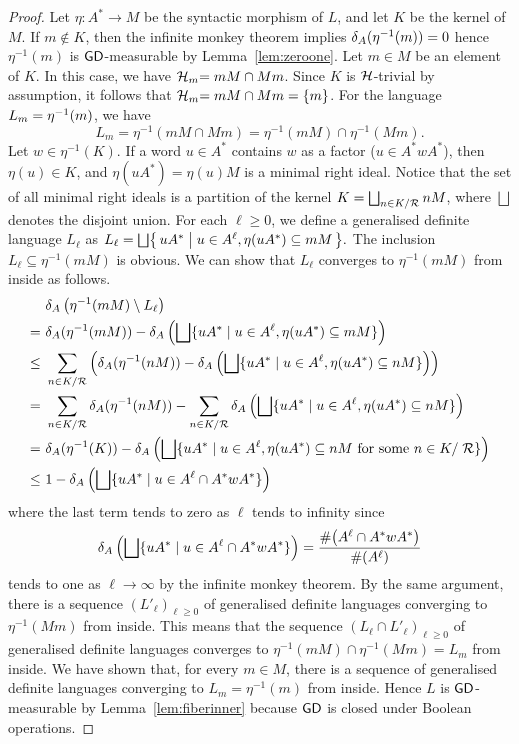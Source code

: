\begin{proof}
Let \(\eta\colon A^* \rightarrow M\) be the syntactic morphism of \(L\), and
let \(K\) be the kernel of \(M\).
If \(m \not\in K\), then the infinite monkey theorem implies 
\(\delta_{A}(\eta^{-1}(m)) = 0\) hence \(\eta^{-1}(m)\) is \(\mathsf{GD}\)-measurable by Lemma~\ref{lem:zeroone}.
Let \(m \in M\) be an element of \(K\).
In this case, we have \(\mathrel{\cal H}_m = mM \cap Mm\).
Since \(K\) is \(\mathrel{\cal H}\)-trivial by assumption, it follows that
\(\mathrel{\cal H}_m = mM \cap Mm = \{m\}\).
For the language \(L_m = \eta^{-1}(m)\), we have
\[
 L_m = \eta^{-1}(mM \cap Mm)
 = \eta^{-1}(mM) \cap \eta^{-1}(Mm).
\]
Let \(w \in \eta^{-1}(K)\).
If a word \(u \in A^*\) contains \(w\) as a factor (\ie \(u \in A^* w A^*\)), then \(\eta(u) \in K\), and \(\eta(uA^*) = \eta(u) M\) is a minimal right ideal. 
Notice that the set of all minimal right ideals is a partition of the kernel 
\(
 K = \bigsqcup_{n \in K / \mathrel{\cal R}} nM
\), where \(\bigsqcup\) denotes the disjoint union.
For each \(\ell \geq 0\), we define a generalised definite language \(L_\ell\) as
\(
 L_\ell = \bigsqcup\set{uA^*}{u \in A^\ell, \eta(uA^*) \subseteq mM}.
\)
The inclusion \(L_\ell \subseteq \eta^{-1}(mM)\) is obvious.
We can show that \(L_\ell\) converges to \(\eta^{-1}(mM)\) from inside as follows.
\begin{align*}
& \,\, \delta_{A}\left(\eta^{-1}(mM) \setminus L_\ell\right)\\
= & \,\,
\delta_{A}(\eta^{-1}(mM)) - \delta_{A}\left(\bigsqcup\{ uA^* \mid u \in A^\ell, \eta(uA^*) \subseteq mM\}\right)\\
\leq & \,\,
\sum_{n \in K / \mathrel{\cal R}} \left( \delta_{A}(\eta^{-1}(nM)) - \delta_{A}\left(\bigsqcup\{ uA^* \mid u \in A^\ell, \eta(uA^*) \subseteq nM\}\right) \right)\\
= & \,\,
\sum_{n \in K / \mathrel{\cal R}} \delta_{A}(\eta^{-1}(nM))
 - \sum_{n \in K / \mathrel{\cal R}} \delta_{A}\left(\bigsqcup\{ uA^* \mid u \in A^\ell, \eta(uA^*) \subseteq nM\}\right)\\
= & \,\,
\delta_{A}(\eta^{-1}(K))
 - \delta_{A}\left(\bigsqcup\{ uA^* \mid u \in A^\ell, \eta(uA^*) \subseteq nM \text{ for some } n \in K/\mathrel{\cal R}\}\right)\\
\leq & \,\,
1 - \delta_{A}\left(\bigsqcup\{ uA^* \mid u \in A^\ell \cap A^* w A^*\}\right)
\end{align*}
where the last term tends to zero as \(\ell\) tends to infinity since 
\[
\delta_{A}\left(\bigsqcup\{ uA^* \mid u \in A^\ell \cap A^* w A^*\}\right)
= \frac{\#\!\left(A^\ell \cap A^* w A^*\right)}{\#\!\left(A^\ell\right)}
\]
tends to one as \(\ell \to \infty\) by the infinite monkey theorem.
By the same argument, there is a sequence \((L'_\ell)_{\ell \geq 0}\) of generalised definite languages converging to \(\eta^{-1}(Mm)\) from inside.
This means that the sequence \((L_\ell \cap L'_\ell)_{\ell \geq 0}\)
of generalised definite languages converges to \(\eta^{-1}(mM) \cap \eta^{-1}(Mm) = L_m\) from inside.
We have shown that, for every \(m \in M\),
there is a sequence of generalised definite languages converging to \(L_m = \eta^{-1}(m)\) from inside.
Hence \(L\) is \(\mathsf{GD}\)-measurable by Lemma~\ref{lem:fiberinner} because \(\mathsf{GD}\) is closed under Boolean operations.
\end{proof}

